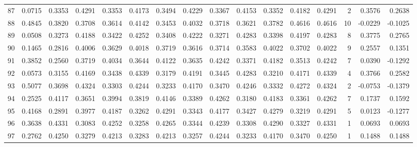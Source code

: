 \begin{tabular}{lrrrrrrrrrrrrrrr}
87  &      0.0715 &  0.3353 &  0.4291 &  0.3353 &  0.4173 &  0.3494 &  0.4229 &  0.3367 &  0.4153 &  0.3352 &   0.4182 &     0.4291 &      2 &                    0.3576 &                     0.2638 \\
88  &      0.4845 &  0.3820 &  0.3708 &  0.3614 &  0.4142 &  0.3453 &  0.4032 &  0.3718 &  0.3621 &  0.3782 &   0.4616 &     0.4616 &     10 &                   -0.0229 &                    -0.1025 \\
89  &      0.0508 &  0.3273 &  0.4188 &  0.3422 &  0.4252 &  0.3408 &  0.4222 &  0.3271 &  0.4283 &  0.3398 &   0.4197 &     0.4283 &      8 &                    0.3775 &                     0.2765 \\
90  &      0.1465 &  0.2816 &  0.4006 &  0.3629 &  0.4018 &  0.3719 &  0.3616 &  0.3714 &  0.3583 &  0.4022 &   0.3702 &     0.4022 &      9 &                    0.2557 &                     0.1351 \\
91  &      0.3852 &  0.2560 &  0.3719 &  0.4034 &  0.3644 &  0.4122 &  0.3635 &  0.4242 &  0.3371 &  0.4182 &   0.3513 &     0.4242 &      7 &                    0.0390 &                    -0.1292 \\
92  &      0.0573 &  0.3155 &  0.4169 &  0.3438 &  0.4339 &  0.3179 &  0.4191 &  0.3445 &  0.4283 &  0.3210 &   0.4171 &     0.4339 &      4 &                    0.3766 &                     0.2582 \\
93  &      0.5077 &  0.3698 &  0.4324 &  0.3303 &  0.4244 &  0.3233 &  0.4170 &  0.3470 &  0.4246 &  0.3332 &   0.4272 &     0.4324 &      2 &                   -0.0753 &                    -0.1379 \\
94  &      0.2525 &  0.4117 &  0.3651 &  0.3994 &  0.3819 &  0.4146 &  0.3389 &  0.4262 &  0.3180 &  0.4183 &   0.3361 &     0.4262 &      7 &                    0.1737 &                     0.1592 \\
95  &      0.4168 &  0.2891 &  0.3977 &  0.4187 &  0.3262 &  0.4291 &  0.3343 &  0.4177 &  0.3427 &  0.4279 &   0.3219 &     0.4291 &      5 &                    0.0123 &                    -0.1277 \\
96  &      0.3638 &  0.4331 &  0.3083 &  0.4252 &  0.3258 &  0.4265 &  0.3344 &  0.4239 &  0.3308 &  0.4290 &   0.3327 &     0.4331 &      1 &                    0.0693 &                     0.0693 \\
97  &      0.2762 &  0.4250 &  0.3279 &  0.4213 &  0.3283 &  0.4213 &  0.3257 &  0.4244 &  0.3233 &  0.4170 &   0.3470 &     0.4250 &      1 &                    0.1488 &                     0.1488 \\

\end{tabular}
